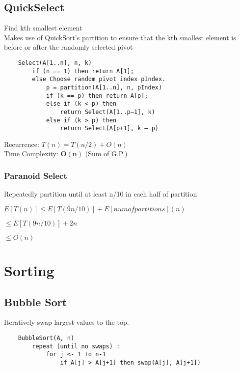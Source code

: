 \documentclass{article}
\begin{document}
    \pagebreak

    \subsection{QuickSelect}

    Find kth smallest element\\

    \noindent Makes use of QuickSort's \hyperref[partition]{partition} to ensure that the kth smallest element 
    is before or after the randomly selected pivot

    \begin{verbatim}
    Select(A[1..n], n, k)
        if (n == 1) then return A[1];
        else Choose random pivot index pIndex.
            p = partition(A[1..n], n, pIndex)
            if (k == p) then return A[p];
            else if (k < p) then
                return Select(A[1..p–1], k)
            else if (k > p) then
                return Select(A[p+1], k – p)
    \end{verbatim}

    \noindent Recurrence: $T(n) = T(n/2) + O(n)$\\

    \noindent Time Complexity: $\bm{O(n)}$ (Sum of G.P.)

    \subsubsection{Paranoid Select}

    Repeatedly partition until at least n/10 in each half of partition

    $E[T(n)] \leq E[T(9n/10)] + E[num of partitions](n)$

    $\leq E[T(9n/10)] + 2n$

    $\leq O(n)$

    \pagebreak

    \section{Sorting}

    \subsection{Bubble Sort}

    Iteratively swap largest values to the top.

    \begin{verbatim}
    BubbleSort(A, n)
        repeat (until no swaps) :
            for j <- 1 to n-1
                if A[j] > A[j+1] then swap(A[j], A[j+1])

    \end{verbatim}
    
\end{document}
